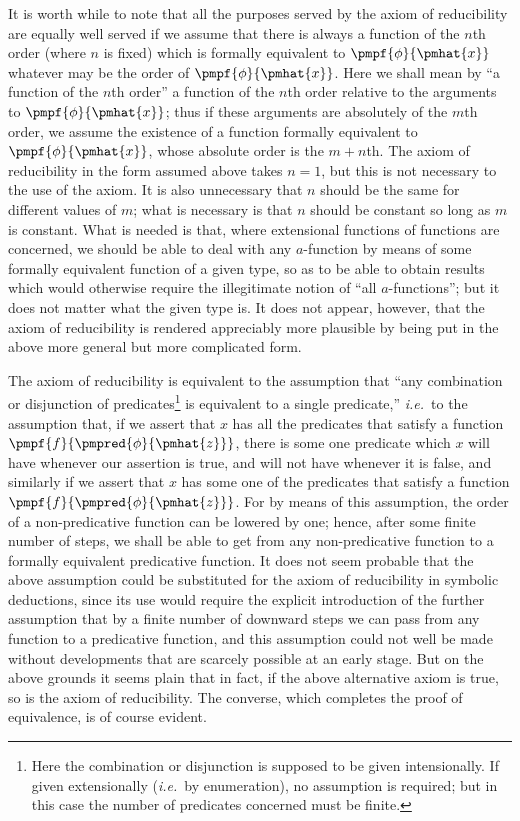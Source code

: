 \documentclass[letterpaper,12pt,openany,leqno]{book}
\newcommand{\pagefirst}[1]{\marginnote[\boxed{\text{#1}}]{\boxed{\text{#1}}}}
\begin{document}
It is worth while to note that all the purposes served by the axiom of reducibility are equally well served if we assume that there is always a function of the $n$th order (where $n$ is fixed) which is formally equivalent to $\pmpf{\phi}{\pmhat{x}}$ whatever may be the order of $\pmpf{\phi}{\pmhat{x}}$. Here we shall mean by ``a function of the $n$th order'' a function of the $n$th order relative to the arguments to $\pmpf{\phi}{\pmhat{x}}$; thus if these arguments are absolutely of the $m$th order, we assume the existence of a function formally equivalent to $\pmpf{\phi}{\pmhat{x}}$, whose absolute order is the $m+n$th. The axiom of reducibility in the form assumed above takes $n = 1$, but this is not necessary to the use of the axiom. It is also unnecessary that $n$ should be the same for different values of $m$; what is necessary is that $n$ should be constant so long as $m$ is constant. What is needed is that, where extensional functions of functions are concerned, we should be able to deal with any $a$-function by means of some formally equivalent function of a given type, so as to be able to obtain results which would otherwise require the illegitimate notion of ``all $a$-functions''; but it does not matter what the given type is. It does not appear, however, that the axiom of reducibility is rendered appreciably more plausible by being put in the above more general but more complicated form.

The axiom of reducibility is equivalent to the assumption that ``any combination or disjunction of predicates\footnote{Here the combination or disjunction is supposed to be given intensionally. If given extensionally (\textit{i.e.}\ by enumeration), no assumption is required; but in this case the number of predicates concerned must be finite.} is equivalent to a single predicate,'' \textit{i.e.}\ to the assumption that, if we assert that $x$ has all the predicates that satisfy a function $\pmpf{f}{\pmpred{\phi}{\pmhat{z}}}$, there is some one predicate which $x$ will have whenever our assertion is true, and will not have whenever it is false, and similarly if we assert that $x$ has some one of the predicates that satisfy a function $\pmpf{f}{\pmpred{\phi}{\pmhat{z}}}$. For by means of this assumption, the order of a non-predicative function can be lowered by one; hence, after some finite number of steps, we shall be able to get from any non-predicative function to a formally equivalent predicative function. It does not seem probable that \pagefirst{62} the above assumption could be substituted for the axiom of reducibility in symbolic deductions, since its use would require the explicit introduction of the further assumption that by a finite number of downward steps we can pass from any function to a predicative function, and this assumption could not well be made without developments that are scarcely possible at an early stage. But on the above grounds it seems plain that in fact, if the above alternative axiom is true, so is the axiom of reducibility. The converse, which completes the proof of equivalence, is of course evident. 
\end{document}
